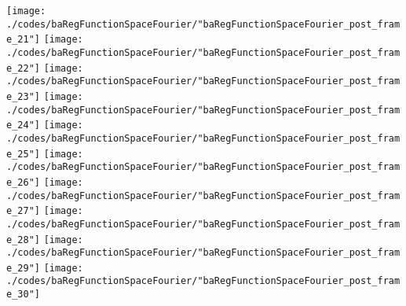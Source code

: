 \begin{frame}{\insertsection}
\begin{center}
{\begin{animateinline}{15}
				 \texttt{[image: ./codes/baRegFunctionSpaceFourier/"baRegFunctionSpaceFourier\_post\_frame\_21"]}\newframe
				 \texttt{[image: ./codes/baRegFunctionSpaceFourier/"baRegFunctionSpaceFourier\_post\_frame\_22"]}\newframe
				 \texttt{[image: ./codes/baRegFunctionSpaceFourier/"baRegFunctionSpaceFourier\_post\_frame\_23"]}\newframe
				 \texttt{[image: ./codes/baRegFunctionSpaceFourier/"baRegFunctionSpaceFourier\_post\_frame\_24"]}\newframe
				 \texttt{[image: ./codes/baRegFunctionSpaceFourier/"baRegFunctionSpaceFourier\_post\_frame\_25"]}\newframe
				 \texttt{[image: ./codes/baRegFunctionSpaceFourier/"baRegFunctionSpaceFourier\_post\_frame\_26"]}\newframe
				 \texttt{[image: ./codes/baRegFunctionSpaceFourier/"baRegFunctionSpaceFourier\_post\_frame\_27"]}\newframe
				 \texttt{[image: ./codes/baRegFunctionSpaceFourier/"baRegFunctionSpaceFourier\_post\_frame\_28"]}\newframe
				 \texttt{[image: ./codes/baRegFunctionSpaceFourier/"baRegFunctionSpaceFourier\_post\_frame\_29"]}\newframe
				 \texttt{[image: ./codes/baRegFunctionSpaceFourier/"baRegFunctionSpaceFourier\_post\_frame\_30"]}
			 \end{animateinline}
			}
	\end{center}
    
\end{frame}


